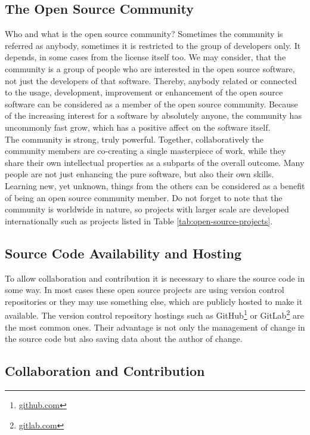 \documentclass[11pt,a4paper]{article}
\theoremstyle{definition}
\begin{document}
    \subsection{The Open Source Community}

    Who and what is the open source community? Sometimes the community is referred as anybody, sometimes it is restricted to the group of developers only. It depends, in some cases from the license itself too. We may consider, that the community is a group of people who are interested in the open source software, not just the developers of that software. Thereby, anybody related or connected to the usage, development, improvement or enhancement of the open source software can be considered as a member of the open source community. Because of the increasing interest for a software by absolutely anyone, the community has uncommonly fast grow, which has a positive affect on the software itself.\\

    The community is strong, truly powerful. Together, collaboratively the community members are co-creating a single masterpiece of work, while they share their own intellectual properties as a subparts of the overall outcome. Many people are not just enhancing the pure software, but also their own skills. Learning new, yet unknown, things from the others can be considered as a benefit of being an open source community member. Do not forget to note that the community is worldwide in nature, so projects with larger scale are developed internationally such as projects listed in Table \ref{tab:open-source-projects}.

    \subsection{Source Code Availability and Hosting}

    To allow collaboration and contribution it is necessary to share the source code in some way. In most cases these open source projects are using version control repositories or they may use something else, which are publicly hosted to make it available. The version control repository hostings such as GitHub\footnote{\href{https://github.com/}{github.com}} or GitLab\footnote{\href{https://gitlab.com/}{gitlab.com}} are the most common ones. Their advantage is not only the management of change in the source code but also saving data about the author of change.

    \subsection{Collaboration and Contribution}
\end{document}
